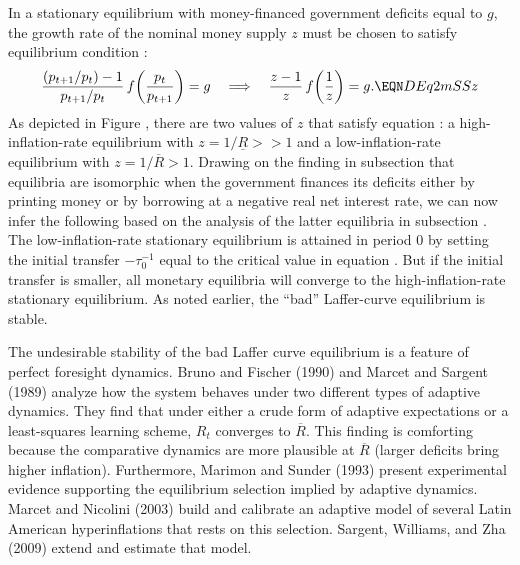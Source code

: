 In a stationary equilibrium with money-financed government deficits equal to $g$,  
the growth rate of the nominal money supply $z$ must be chosen to satisfy
equilibrium condition :
$$   {(p_{t+1}/p_t) -1  \over p_{t+1}/p_t} \,
         f\!\left({p_t \over p_{t+1}}\right) = g
\quad \Longrightarrow \quad 
   {z -1  \over z} \,
         f\!\left({1 \over z}\right) = g. \EQN DEq2mSSz 
$$
As depicted in Figure , there are two values of $z$ 
that satisfy equation : 
a high-inflation-rate equilibrium with $z=1/ \underline R>>1$ 
and a low-inflation-rate equilibrium with $z=1/ \overline R>1$. 
Drawing on the finding in subsection  that 
equilibria are isomorphic when the government finances its 
deficits either by printing money or by borrowing at a 
negative real net interest rate, we can now infer the 
following based on the analysis of the latter 
equilibria in subsection . The 
low-inflation-rate stationary equilibrium is 
attained in period $0$ by setting the initial 
transfer $-\tau^{-1}_0$ equal to the critical value in 
equation . But if the initial transfer 
is smaller, all monetary equilibria will converge
to the high-inflation-rate stationary equilibrium. 
As noted earlier, the ``bad'' Laffer-curve equilibrium is 
stable.






The undesirable stability of the bad Laffer curve equilibrium is a feature of
perfect foresight dynamics.
Bruno and Fischer (1990) and Marcet and Sargent (1989) analyze
how the system behaves under two different types of adaptive
dynamics.  They find that under either a crude form
of  adaptive expectations  or a least-squares learning scheme,
$R_t$ converges to  $\overline R$.   This finding  is comforting because
the comparative dynamics are more plausible at $\overline  R$
(larger deficits bring higher inflation).  Furthermore,
Marimon and Sunder (1993) present experimental evidence
supporting the equilibrium selection implied by adaptive dynamics.
Marcet and Nicolini  (2003) build and calibrate an adaptive model of several
Latin American hyperinflations that rests on this selection. Sargent, Williams, and Zha (2009)
extend and estimate that model.
%
%








